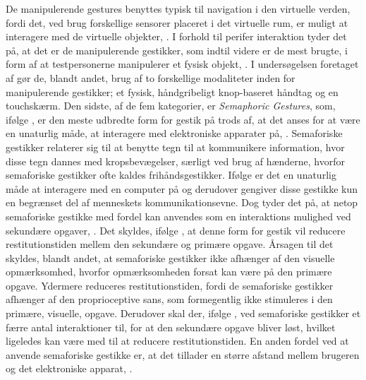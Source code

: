 De manipulerende gestures benyttes typisk til navigation i den virtuelle verden, fordi det, ved brug forskellige sensorer placeret i det virtuelle rum, er muligt at interagere med de virtuelle objekter, \parencite[ss. 14-15]{PDF:ATaxonomyOfGestures}. I forhold til perifer interaktion tyder det på, at det er de manipulerende gestikker, som indtil videre er de mest brugte, i form af at testpersonerne manipulerer et fysisk objekt, \parencite[s. 164]{PDF:ComparingInputModalities}. I undersøgelsen foretaget af \textcite[ss. 164-165]{PDF:ComparingInputModalities} gør de, blandt andet, brug af to forskellige modaliteter inden for manipulerende gestikker; et fysisk, håndgribeligt knop-baseret håndtag og en touchskærm.\blankline
%
Den sidste, af de fem kategorier, er \textit{Semaphoric Gestures}, som, ifølge \textcite[s. 6]{PDF:ATaxonomyOfGestures}, er den meste udbredte form for gestik på trods af, at det anses for at være en unaturlig måde, at interagere med elektroniske apparater på, \parencite[s. 1961]{PDF:AStudyOnTheUseOfSemaphoricGestures}. Semaforiske gestikker relaterer sig til at benytte tegn til at kommunikere information, hvor disse tegn dannes med kropsbevægelser, særligt ved brug af hænderne, hvorfor semaforiske gestikker ofte kaldes frihåndsgestikker. Ifølge \textcite[s. 1961]{PDF:AStudyOnTheUseOfSemaphoricGestures} er det en unaturlig måde at interagere med en computer på og derudover gengiver disse gestikke kun en begrænset del af menneskets kommunikationsevne. Dog tyder det på, at netop semaforiske gestikke med fordel kan anvendes som en interaktions mulighed ved sekundære opgaver, \parencite[s. 1961]{PDF:AStudyOnTheUseOfSemaphoricGestures}. Det skyldes, ifølge \textcite[s. 1964]{PDF:AStudyOnTheUseOfSemaphoricGestures}, at denne form for gestik vil reducere restitutionstiden mellem den sekundære og primære opgave. Årsagen til det skyldes, blandt andet, at semaforiske gestikker ikke afhænger af den visuelle opmærksomhed, hvorfor opmærksomheden forsat kan være på den primære opgave. Ydermere reduceres restitutionstiden, fordi de semaforiske gestikker afhænger af den proprioceptive sans, som formegentlig ikke stimuleres i den primære, visuelle, opgave. Derudover skal der, ifølge \textcite[s. 1964]{PDF:AStudyOnTheUseOfSemaphoricGestures}, ved semaforiske gestikker et færre antal interaktioner til, for at den sekundære opgave bliver løst, hvilket ligeledes kan være med til at reducere restitutionstiden. En anden fordel ved at anvende semaforiske gestikke er, at det tillader en større afstand mellem brugeren og det elektroniske apparat, \parencite[s. 6]{PDF:ATaxonomyOfGestures}.    

